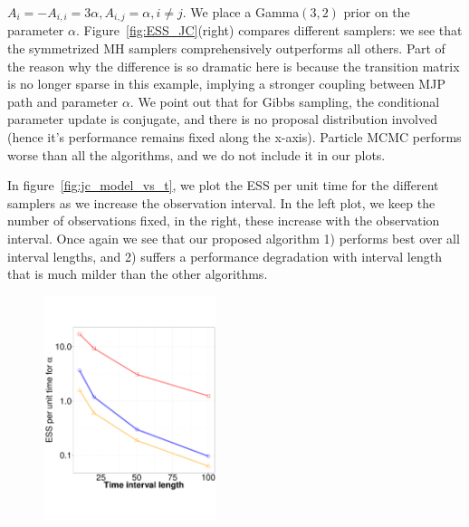 {$A_i = -A_{i,i} = 3\alpha, A_{i, j} = \alpha,i \neq j.$
We place a Gamma$(3,2)$ prior on the parameter $\alpha$.
Figure~\ref{fig:ESS_JC}(right) compares different samplers: we see that the
symmetrized MH samplers comprehensively outperforms all others.
Part of the reason why the difference is so dramatic here is because the
transition matrix is no longer sparse in this example, implying a stronger
coupling between MJP path and parameter $\alpha$. We point out that for Gibbs
sampling, the conditional parameter update is conjugate, and there is no
proposal distribution involved (hence it's performance remains fixed along
the x-axis). Particle MCMC performs worse
than all the algorithms, and we do not include it in our plots.

In figure~\ref{fig:jc_model_vs_t}, we plot the ESS per unit time for the
different samplers as we increase the observation interval. In the left plot,
we keep the number of observations fixed, in the right, these increase with
the observation interval. Once again we see that our proposed algorithm
1) performs best over all interval lengths, and 2) suffers a performance
degradation with interval length that is much milder than the other algorithms.
  \begin{figure}%
  \centering
  \begin{minipage}[!hp]{0.73\linewidth}
  \centering
    \includegraphics [width=0.45\textwidth, angle=0]{figs/ESS_vs_t_alpha_JC.pdf}

\end{minipage}
\end{figure}}

